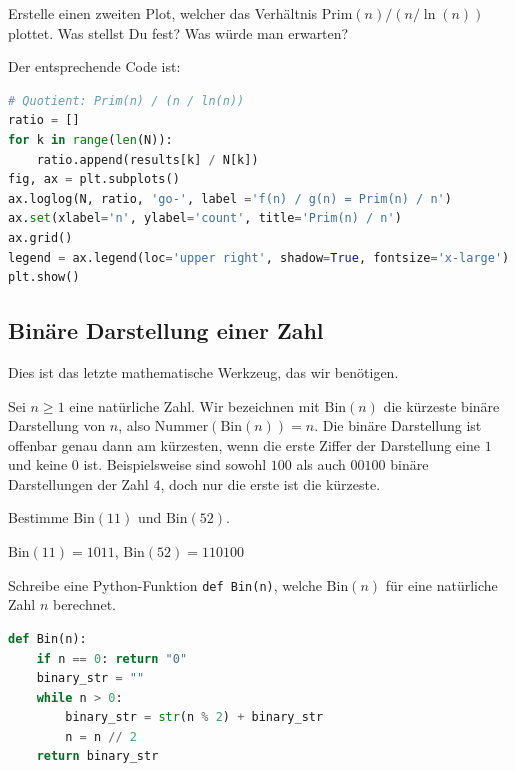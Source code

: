 \begin{myexercise}
	Erstelle einen zweiten Plot, welcher das Verhältnis $\text{Prim}(n) / (n / \ln{(n)})$ plottet. Was stellst Du fest? Was würde man erwarten?
	\begin{myanswer}
		Der entsprechende Code ist:
		\begin{lstlisting}[language=Python,numbers=none]
# Quotient: Prim(n) / (n / ln(n))
ratio = []
for k in range(len(N)):
    ratio.append(results[k] / N[k])
fig, ax = plt.subplots()
ax.loglog(N, ratio, 'go-', label ='f(n) / g(n) = Prim(n) / n')
ax.set(xlabel='n', ylabel='count', title='Prim(n) / n')
ax.grid()
legend = ax.legend(loc='upper right', shadow=True, fontsize='x-large')
plt.show()
\end{lstlisting}
	\end{myanswer}
\end{myexercise}

\clearpage

\subsection{Binäre Darstellung einer Zahl}
Dies ist das letzte mathematische Werkzeug, das wir benötigen.

Sei $n\geq 1$ eine natürliche Zahl. Wir bezeichnen mit $\text{Bin}(n)$ die kürzeste binäre Darstellung von $n$, also $\text{Nummer}(\text{Bin}(n)) = n$.
Die binäre Darstellung ist offenbar genau dann am kürzesten, wenn die erste Ziffer der Darstellung eine $1$ und keine $0$ ist.
Beispielsweise sind sowohl $100$ als auch $00100$ binäre Darstellungen der Zahl $4$, doch nur die erste ist die kürzeste.

\begin{myexercise}
	Bestimme $\text{Bin}(11)$ und $\text{Bin}(52)$.
	\begin{myanswer}
		$\text{Bin}(11) = 1011$, $\text{Bin}(52) = 110100$
	\end{myanswer}
\end{myexercise}

\begin{mychallenge}
	Schreibe eine Python-Funktion \lstinline|def Bin(n)|, welche $\text{Bin}(n)$ für eine natürliche Zahl $n$ berechnet.
	\begin{myanswer}
		\begin{lstlisting}[language=Python,numbers=none]
def Bin(n):
    if n == 0: return "0"
    binary_str = ""
    while n > 0:
        binary_str = str(n % 2) + binary_str
        n = n // 2
    return binary_str
\end{lstlisting}
	\end{myanswer}
\end{mychallenge}

